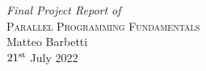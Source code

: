 \begin{center}
    \textit {\Large Final Project Report of}\\[8pt]
    {\LARGE \textsc{Parallel Programming Fundamentals}}\\[12pt]
    {\Large Matteo Barbetti}\\[12pt]
    {\large $21^{\rm{st}}$ July 2022}
\end{center}